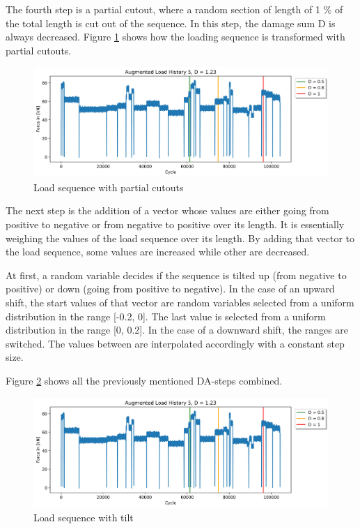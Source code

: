 The fourth step is a partial cutout, where a random section of length of 1 \% of the total length is cut out of the sequence. In this step, the damage sum D is always decreased. Figure \ref{fig:Verlauf_5_cutout} shows how the loading sequence is transformed with partial cutouts.

\begin{figure}[H]
	\centering
	\includegraphics[width=1\linewidth]{IMGs/Verlauf_5_coutout.jpg}
	\caption{Load sequence with partial cutouts}
	\label{fig:Verlauf_5_cutout}
\end{figure}

The next step is the addition of a vector whose values are either going from positive to negative or from negative to positive over its length. It is essentially weighing the values of the load sequence over its length. By adding that vector to the load sequence, some values are increased while other are decreased. 

At first, a random variable decides if the sequence is tilted up (from negative to positive) or down (going from positive to negative). In the case of an upward shift, the start values of that vector are random variables selected from a uniform distribution in the range [-0.2, 0]. The last value is selected from a uniform distribution in the range [0, 0.2]. In the case of a downward shift, the ranges are switched.
The values between are interpolated accordingly with a constant step size.


Figure \ref{fig:Verlauf_5_tilt} shows all the previously mentioned DA-steps combined.

\begin{figure}[H]
	\centering
	\includegraphics[width=1\linewidth]{IMGs/Verlauf_5_tilt.jpg}
	\caption{Load sequence with tilt}
	\label{fig:Verlauf_5_tilt}
\end{figure}

